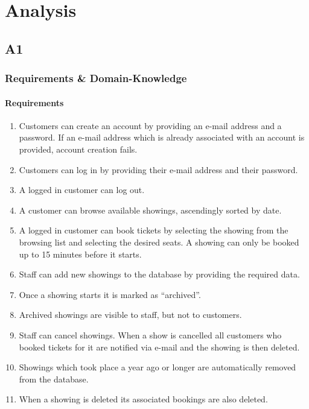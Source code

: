 \documentclass[a4paper,10pt,titlepage,bibtotoc,bibtotocnumbered]{scrreprt}
\begin{document}
\tableofcontents
\listoffigures

\chapter{Analysis}
\section{A1}

\subsection{Requirements \& Domain-Knowledge}

\subsubsection{Requirements}
\begin{enumerate}[R1]
	\item\label{enum:R1} Customers can create an account by providing an e-mail address and a password. If an e-mail address which is already associated with an account is provided, account creation fails.
    \item Customers can log in by providing their e-mail address and their password.
    \item A logged in customer can log out.
    \item\label{enum:R4} A customer can browse available showings, ascendingly sorted by date.
    \item\label{enum:R5} A logged in customer can book tickets by selecting the showing from the browsing list and selecting the desired seats. A showing can only be booked up to 15 minutes before it starts.
    \item Staff can add new showings to the database by providing the required data.
    \item\label{enum:R7} Once a showing starts it is marked as \enquote{archived}.
    \item\label{enum:R8} Archived showings are visible to staff, but not to customers.
    \item Staff can cancel showings. When a show is cancelled all customers who booked tickets for it are notified via e-mail and the showing is then deleted.
    \item Showings which took place a year ago or longer are automatically removed from the database.
    \item When a showing is deleted its associated bookings are also deleted.

\end{enumerate}
\end{document}
